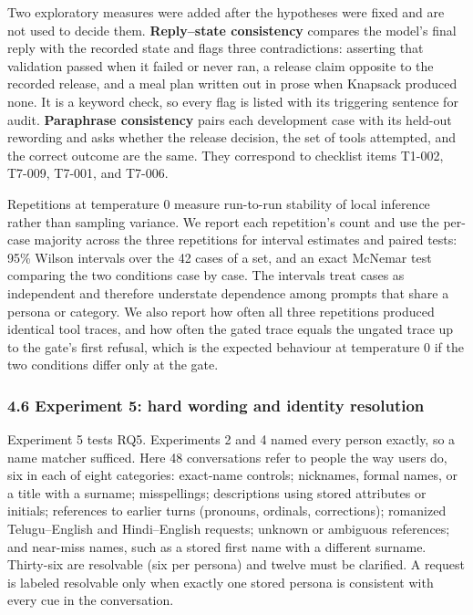 \documentclass[
  10pt,
  letterpaper,
]{article}
\begin{document}
Two exploratory measures were added after the hypotheses were fixed and
are not used to decide them. \textbf{Reply--state consistency} compares
the model's final reply with the recorded state and flags three
contradictions: asserting that validation passed when it failed or never
ran, a release claim opposite to the recorded release, and a meal plan
written out in prose when Knapsack produced none. It is a keyword check,
so every flag is listed with its triggering sentence for audit.
\textbf{Paraphrase consistency} pairs each development case with its
held-out rewording and asks whether the release decision, the set of
tools attempted, and the correct outcome are the same. They correspond
to checklist items T1-002, T7-009, T7-001, and T7-006.

Repetitions at temperature 0 measure run-to-run stability of local
inference rather than sampling variance. We report each repetition's
count and use the per-case majority across the three repetitions for
interval estimates and paired tests: 95\% Wilson intervals over the 42
cases of a set, and an exact McNemar test comparing the two conditions
case by case. The intervals treat cases as independent and therefore
understate dependence among prompts that share a persona or category. We
also report how often all three repetitions produced identical tool
traces, and how often the gated trace equals the ungated trace up to the
gate's first refusal, which is the expected behaviour at temperature 0
if the two conditions differ only at the gate.

\subsubsection{4.6 Experiment 5: hard wording and identity
resolution}\label{experiment-5-hard-wording-and-identity-resolution}

Experiment 5 tests RQ5. Experiments 2 and 4 named every person exactly,
so a name matcher sufficed. Here 48 conversations refer to people the
way users do, six in each of eight categories: exact-name controls;
nicknames, formal names, or a title with a surname; misspellings;
descriptions using stored attributes or initials; references to earlier
turns (pronouns, ordinals, corrections); romanized Telugu--English and
Hindi--English requests; unknown or ambiguous references; and near-miss
names, such as a stored first name with a different surname. Thirty-six
are resolvable (six per persona) and twelve must be clarified. A request
is labeled resolvable only when exactly one stored persona is consistent
with every cue in the conversation.
\end{document}

